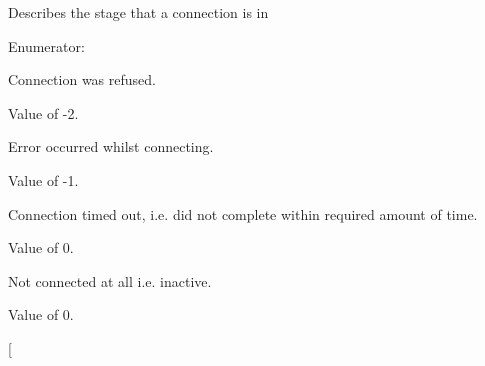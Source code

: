 Describes the stage that a connection is in \begin{Desc}
\item[Enumerator: ]\par
\begin{description}
\item[{\em 
\hypertarget{classcl_networking_utility_a15dd34683154e07d5843f8f5432fec6da1a0333d6bbf1103cfcdfa4621133e3a4}{
REFUSED}
\label{classcl_networking_utility_a15dd34683154e07d5843f8f5432fec6da1a0333d6bbf1103cfcdfa4621133e3a4}
}]Connection was refused. \par
 Value of -\/2. \item[{\em 
\hypertarget{classcl_networking_utility_a15dd34683154e07d5843f8f5432fec6dafafd46790b41dc51910c2cc598024480}{
CONNECTION\_\-ERROR}
\label{classcl_networking_utility_a15dd34683154e07d5843f8f5432fec6dafafd46790b41dc51910c2cc598024480}
}]Error occurred whilst connecting. \par
 Value of -\/1. \item[{\em 
\hypertarget{classcl_networking_utility_a15dd34683154e07d5843f8f5432fec6da4ab4eb1108087cf8c17bff8585cf8270}{
TIMED\_\-OUT}
\label{classcl_networking_utility_a15dd34683154e07d5843f8f5432fec6da4ab4eb1108087cf8c17bff8585cf8270}
}]Connection timed out, i.e. did not complete within required amount of time. \par
 Value of 0. \item[{\em 
\hypertarget{classcl_networking_utility_a15dd34683154e07d5843f8f5432fec6da7ea7f5aa34e94ec65b905c2a37610583}{
NOT\_\-CONNECTED}
\label{classcl_networking_utility_a15dd34683154e07d5843f8f5432fec6da7ea7f5aa34e94ec65b905c2a37610583}
}]Not connected at all i.e. inactive.\par
 Value of 0. \item[{\em 
}
\end{description}
\end{Desc}
